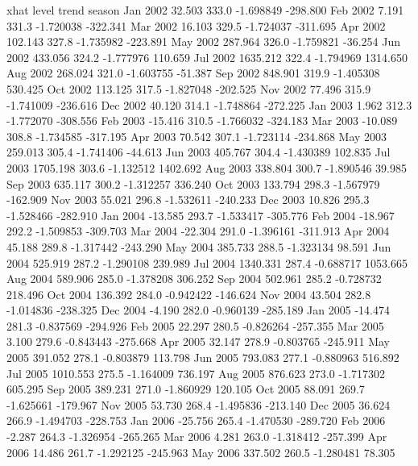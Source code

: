 \documentclass{article}\usepackage{graphicx, color}
\begin{document}
\begin{center}
\begin{Schunk}
\begin{Soutput}
             xhat level     trend   season
Jan 2002   32.503 333.0 -1.698849 -298.800
Feb 2002    7.191 331.3 -1.720038 -322.341
Mar 2002   16.103 329.5 -1.724037 -311.695
Apr 2002  102.143 327.8 -1.735982 -223.891
May 2002  287.964 326.0 -1.759821  -36.254
Jun 2002  433.056 324.2 -1.777976  110.659
Jul 2002 1635.212 322.4 -1.794969 1314.650
Aug 2002  268.024 321.0 -1.603755  -51.387
Sep 2002  848.901 319.9 -1.405308  530.425
Oct 2002  113.125 317.5 -1.827048 -202.525
Nov 2002   77.496 315.9 -1.741009 -236.616
Dec 2002   40.120 314.1 -1.748864 -272.225
Jan 2003    1.962 312.3 -1.772070 -308.556
Feb 2003  -15.416 310.5 -1.766032 -324.183
Mar 2003  -10.089 308.8 -1.734585 -317.195
Apr 2003   70.542 307.1 -1.723114 -234.868
May 2003  259.013 305.4 -1.741406  -44.613
Jun 2003  405.767 304.4 -1.430389  102.835
Jul 2003 1705.198 303.6 -1.132512 1402.692
Aug 2003  338.804 300.7 -1.890546   39.985
Sep 2003  635.117 300.2 -1.312257  336.240
Oct 2003  133.794 298.3 -1.567979 -162.909
Nov 2003   55.021 296.8 -1.532611 -240.233
Dec 2003   10.826 295.3 -1.528466 -282.910
Jan 2004  -13.585 293.7 -1.533417 -305.776
Feb 2004  -18.967 292.2 -1.509853 -309.703
Mar 2004  -22.304 291.0 -1.396161 -311.913
Apr 2004   45.188 289.8 -1.317442 -243.290
May 2004  385.733 288.5 -1.323134   98.591
Jun 2004  525.919 287.2 -1.290108  239.989
Jul 2004 1340.331 287.4 -0.688717 1053.665
Aug 2004  589.906 285.0 -1.378208  306.252
Sep 2004  502.961 285.2 -0.728732  218.496
Oct 2004  136.392 284.0 -0.942422 -146.624
Nov 2004   43.504 282.8 -1.014836 -238.325
Dec 2004   -4.190 282.0 -0.960139 -285.189
Jan 2005  -14.474 281.3 -0.837569 -294.926
Feb 2005   22.297 280.5 -0.826264 -257.355
Mar 2005    3.100 279.6 -0.843443 -275.668
Apr 2005   32.147 278.9 -0.803765 -245.911
May 2005  391.052 278.1 -0.803879  113.798
Jun 2005  793.083 277.1 -0.880963  516.892
Jul 2005 1010.553 275.5 -1.164009  736.197
Aug 2005  876.623 273.0 -1.717302  605.295
Sep 2005  389.231 271.0 -1.860929  120.105
Oct 2005   88.091 269.7 -1.625661 -179.967
Nov 2005   53.730 268.4 -1.495836 -213.140
Dec 2005   36.624 266.9 -1.494703 -228.753
Jan 2006  -25.756 265.4 -1.470530 -289.720
Feb 2006   -2.287 264.3 -1.326954 -265.265
Mar 2006    4.281 263.0 -1.318412 -257.399
Apr 2006   14.486 261.7 -1.292125 -245.963
May 2006  337.502 260.5 -1.280481   78.305

\end{Soutput}
\end{Schunk}
\end{center}
\end{document}
